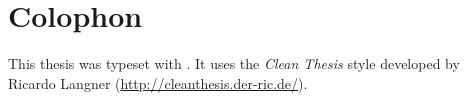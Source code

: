 \pagestyle{empty}
\hfill
\vfill
\section*{Colophon}

This thesis was typeset with \LaTeXe.
It uses the \textit{Clean Thesis} style developed by Ricardo Langner (\url{http://cleanthesis.der-ric.de/}).
